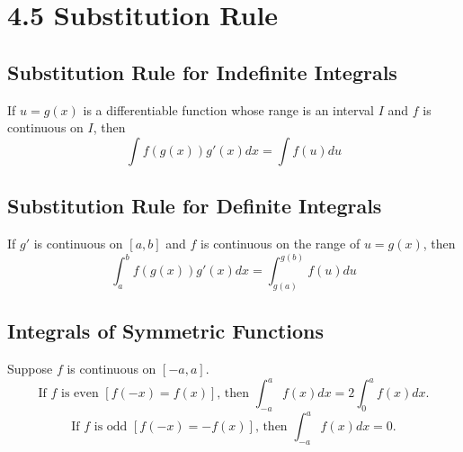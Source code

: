 %
%

\section*{4.5 Substitution Rule}

\subsection*{Substitution Rule for Indefinite Integrals}

If \(u=g(x)\) is a differentiable function whose range is an interval \(I\) and \(f\) is continuous on \(I\), then
$$ \int f(g(x))g'(x)dx = \int f(u)du $$ 

\subsection*{Substitution Rule for Definite Integrals}

If \(g'\) is continuous on \([a, b]\) and \(f\) is continuous on the range of \(u=g(x)\), then 
$$ \int_a^b f(g(x))g'(x)dx=\int_{g(a)}^{g(b)}f(u)du $$

\subsection*{Integrals of Symmetric Functions}

Suppose \(f\) is continuous on \([-a, a]\).
$$ \text{If } f \text{ is even } [f(-x)=f(x)] \text{, then } \int_{-a}^a f(x)dx = 2 \int_{0}^{a} f(x)dx. $$
$$ \text{If } f \text{ is odd } [f(-x)=-f(x)] \text{, then } \int_{-a}^a f(x)dx = 0. $$
